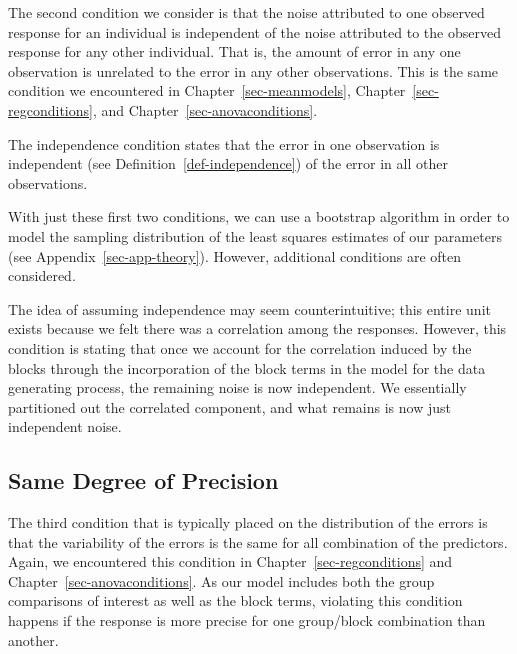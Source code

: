 \documentclass[
  letterpaper,
  DIV=11,
  numbers=noendperiod]{scrreprt}
\theoremstyle{plain}
\theoremstyle{definition}
\theoremstyle{definition}
\theoremstyle{remark}
\begin{document}
The second condition we consider is that the noise attributed to one
observed response for an individual is independent of the noise
attributed to the observed response for any other individual. That is,
the amount of error in any one observation is unrelated to the error in
any other observations. This is the same condition we encountered in
Chapter~\ref{sec-meanmodels}, Chapter~\ref{sec-regconditions}, and
Chapter~\ref{sec-anovaconditions}.

\begin{tcolorbox}[enhanced jigsaw, breakable, titlerule=0mm, colframe=quarto-callout-note-color-frame, bottomtitle=1mm, opacityback=0, rightrule=.15mm, toptitle=1mm, arc=.35mm, bottomrule=.15mm, left=2mm, title=\textcolor{quarto-callout-note-color}{\faInfo}\hspace{0.5em}{Independence Condition}, leftrule=.75mm, coltitle=black, toprule=.15mm, colbacktitle=quarto-callout-note-color!10!white, colback=white, opacitybacktitle=0.6]

The independence condition states that the error in one observation is
independent (see Definition~\ref{def-independence}) of the error in all
other observations.

\end{tcolorbox}

With just these first two conditions, we can use a bootstrap algorithm
in order to model the sampling distribution of the least squares
estimates of our parameters (see Appendix~\ref{sec-app-theory}).
However, additional conditions are often considered.

The idea of assuming independence may seem counterintuitive; this entire
unit exists because we felt there was a correlation among the responses.
However, this condition is stating that once we account for the
correlation induced by the blocks through the incorporation of the block
terms in the model for the data generating process, the remaining noise
is now independent. We essentially partitioned out the correlated
component, and what remains is now just independent noise.

\subsection{Same Degree of Precision}\label{same-degree-of-precision-2}

The third condition that is typically placed on the distribution of the
errors is that the variability of the errors is the same for all
combination of the predictors. Again, we encountered this condition in
Chapter~\ref{sec-regconditions} and Chapter~\ref{sec-anovaconditions}.
As our model includes both the group comparisons of interest as well as
the block terms, violating this condition happens if the response is
more precise for one group/block combination than another.
\end{document}
